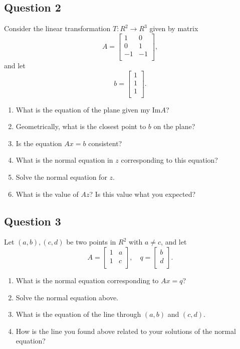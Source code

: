 \documentclass[12pt, a4paper]{article}
\begin{document}
\subsection*{Question 2}
  Consider the linear transformation  $T : R^2 \rightarrow R^3$ given by matrix
\[
A = \begin{bmatrix}
  1  & 0 \\
  0  & 1 \\
  -1 & -1 \\
\end{bmatrix},
\]
and let
\[
b = \begin{bmatrix}
  1 \\
  1 \\
  1 \\
  \end{bmatrix}.
\]
\begin{enumerate}
\item What is the equation of the plane given my Im$A$?
\item Geometrically, what is the closest point to $b$ on the plane? 
\item Is the equation $Ax = b$ consistent?
\item What is the normal equation in $z$ corresponding to this equation?
\item Solve the normal equation for $z$.
\item What is the value of $Az$? Is this value what you expected?
\end{enumerate}

\subsection*{Question 3}
Let $(a,b), (c,d)$ be two points in $R^2$ with $a \ne c$, and let
\[
A = \begin{bmatrix}
  1 & a \\
  1 & c \\
\end{bmatrix},
\quad
q = 
\begin{bmatrix}
  b \\
  d \\
\end{bmatrix}.
\]
\begin{enumerate}
\item What is the normal equation corresponding to $Ax = q$?
\item Solve the normal equation above.
\item What is the equation of the line through $(a,b)$ and $(c,d)$.
  \item How is the line you found above related to your solutions of the normal equation?
  \end{enumerate}
\end{document}
